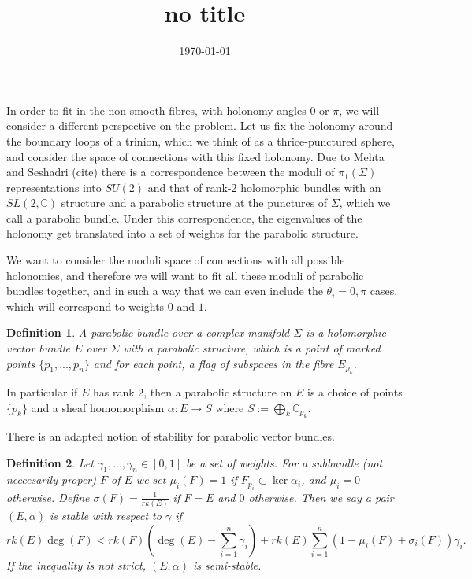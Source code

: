 \documentclass[]{article}
\title{no title}
\date{\today}
\newtheorem{definition}{Definition}
\newcommand{\C}{\mathbb{C}}
\begin{document}
	In order to fit in the non-smooth fibres, with holonomy angles $0$ or $\pi$, we will consider a different perspective on the problem. Let us fix the holonomy around the boundary loops of a trinion, which we think of as a thrice-punctured sphere, and consider the space of connections with this fixed holonomy. Due to Mehta and Seshadri (cite) there is a correspondence between the moduli of $\pi_1(\Sigma)$ representations into $SU(2)$ and that of rank-2 holomorphic bundles with an $SL(2,\C)$ structure and a parabolic structure at the punctures of $\Sigma$, which we call a parabolic bundle. Under this correspondence, the eigenvalues of the holonomy get translated into a set of weights for the parabolic structure. 
	
	We want to consider the moduli space of connections with all possible holonomies, and therefore we will want to fit all these moduli of parabolic bundles together, and in such a way that we can even include the $\theta_i = 0,\pi$ cases, which will correspond to weights $0$ and $1$. 
\begin{definition}
	A \emph{parabolic bundle} over a complex manifold $\Sigma$ is a holomorphic vector bundle $E$ over $\Sigma$ with a \emph{parabolic structure}, which is a point of marked points $\{p_1,...,p_n\}$ and for each point, a flag of subspaces in the fibre $E_{p_k}$. 
\end{definition}
In particular if $E$ has rank 2, then a parabolic structure on $E$ is a choice of points $\{p_k\}$ and a sheaf homomorphism $\alpha:E\to S$ where $S := \bigoplus_{k} \C_{p_k}$.

There is an adapted notion of stability for parabolic vector bundles.
\begin{definition}
	Let $\gamma_1,...,\gamma_n \in [0,1]$ be a set of weights. For a subbundle (not neccesarily proper) $F$ of $E$ we set $\mu_i(F) = 1$ if $F_{p_i} \subset \ker\alpha_i$, and $\mu_i = 0$ otherwise. Define $\sigma(F) = \frac{1}{rk(E)}$ if $F=E$ and $0$ otherwise. Then we say a pair $(E,\alpha)$ is \emph{stable} with respect to $\gamma$ if 
	\begin{equation}
	rk(E)\deg(F) < rk(F)\left(\deg(E) - \sum_{i=1}^n \gamma_i\right) 
	+ rk(E)\sum_{i=1}^n(1 - \mu_i(F) + \sigma_i(F))\gamma_i.
	\end{equation}
	If the inequality is not strict, $(E,\alpha)$ is \emph{semi-stable}.
\end{definition}
\end{document}
